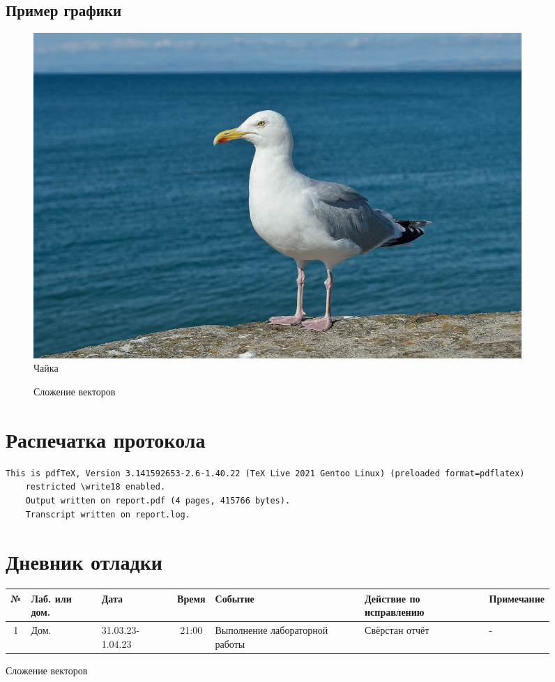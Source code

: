 \documentclass[12pt, letterpaper]{article}
\begin{document}
\begin{figure}[H]
\centering
\subsection{Пример графики}
\begin{figure}[H]
\includegraphics{gull}
\centering
\caption{Чайка}
\end{figure}
\begin{figure}[H]
\centering
\caption{Сложение векторов}
\end{figure}
\section{Распечатка протокола}
\begin{lstlisting}[breaklines]
    This is pdfTeX, Version 3.141592653-2.6-1.40.22 (TeX Live 2021 Gentoo Linux) (preloaded format=pdflatex)
    restricted \write18 enabled.
    Output written on report.pdf (4 pages, 415766 bytes).
    Transcript written on report.log.
\end{lstlisting}  
\section{Дневник отладки}
\begin{tabular}{|c|p{1cm}|p{1.5cm}|c|p{2.5cm}|p{2cm}|p{2.25cm}|}
    \hline
    № & Лаб. или дом. & Дата & Время & Событие & Действие по исправлению & Примечание\\
    \hline
    1 & Дом. & 31.03.23-1.04.23 & 21:00 & Выполнение лабораторной работы & Свёрстан отчёт & -\\
    \hline
\end{tabular}

\end{figure}
\end{document}
